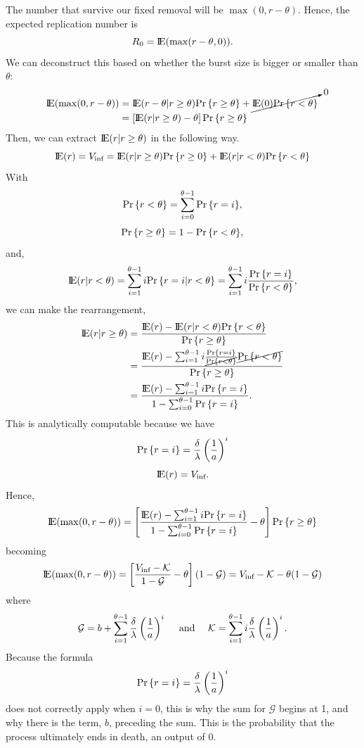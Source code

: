 The number that survive our fixed removal will be $\max({0, r-\theta})$. Hence, the expected replication number is
$$R_0 = {\rm I}\!{\rm E}(\max(r-\theta, 0)).$$
We can deconstruct this based on whether the burst size is bigger or smaller than $\theta$:
\begin{align*}
{\rm I}\!{\rm E}(\max(0, r-\theta))  &= {\rm I}\!{\rm E}(r-\theta | r \geq \theta) {\text{Pr}\left\{r\geq \theta\right\}} + \cancelto{0}{ {\rm I}\!{\rm E}(0){\text{Pr}\left\{r<\theta\right\}}}\\
& = \left[{\rm I}\!{\rm E}(r| r\geq \theta) - \theta\right]{\text{Pr}\left\{r\geq\theta\right\}}
\end{align*}
Then, we can extract ${\rm I}\!{\rm E}(r|r\geq\theta)$ in the following way. 
$${\rm I}\!{\rm E}(r) = V_{\text{inf}}= {\rm I}\!{\rm E}(r|r\geq\theta){\text{Pr}\left\{r\geq 0 \right\}}  + {\rm I}\!{\rm E}(r | r < \theta ){\text{Pr}\left\{r < \theta\right\}}$$
With 
$${\text{Pr}\left\{r<\theta\right\}} = \sum^{\theta - 1}_{i=0} {\text{Pr}\left\{r = i\right\}},$$
$${\text{Pr}\left\{r\geq \theta\right\}} = 1- {\text{Pr}\left\{r<\theta\right\}} ,$$
and,
$${\rm I}\!{\rm E}(r|r<\theta) = \sum^{\theta - 1}_{i=1} i {\text{Pr}\left\{r = i| r < \theta\right\}} =  \sum^{\theta - 1}_{i=1} i \frac{{\text{Pr}\left\{r = i\right\}}}{{\text{Pr}\left\{r < \theta\right\}}},$$
we can make the rearrangement,
\begin{align*}
{\rm I}\!{\rm E}(r|r\geq\theta) &= \frac{{\rm I}\!{\rm E}(r) - {\rm I}\!{\rm E}(r|r<\theta) {\text{Pr}\left\{r<\theta\right\}} }{{\text{Pr}\left\{r\geq \theta\right\}} }\\
&= \frac{{\rm I}\!{\rm E}(r) -       \sum^{\theta - 1}_{i=1} i \frac{{\text{Pr}\left\{r = i\right\}}}{\cancel{{\text{Pr}\left\{r < \theta\right\}}}}  \cancel{{\text{Pr}\left\{r<\theta\right\}}} }{{\text{Pr}\left\{r\geq \theta\right\}} }\\
&= \frac{{\rm I}\!{\rm E}(r)  -   \sum^{\theta - 1}_{i=1} i {\text{Pr}\left\{r = i\right\}} }{1 -  \sum^{\theta - 1}_{i=0} {\text{Pr}\left\{r = i\right\}}}.
\end{align*}
This is analytically computable because we have 
$${\text{Pr}\left\{r=i\right\}} = \frac{\delta}{\lambda}\left(\frac{1}{a}\right)^i$$
$${\rm I}\!{\rm E}(r) = V_{\text{inf}}. $$
Hence,
$${\rm I}\!{\rm E}(\max(0,r-\theta))  =  \left[  \frac{{\rm I}\!{\rm E}(r)  -   \sum^{\theta - 1}_{i=1} i {\text{Pr}\left\{r = i\right\}}}{1 -  \sum^{\theta - 1}_{i=0} {\text{Pr}\left\{r = i\right\}}}   - \theta\right] {\text{Pr}\left\{r\geq \theta\right\}}  $$
becoming 
$${\rm I}\!{\rm E}(\max(0,r-\theta))  =  \left[ \frac{V_{\text{inf}} -  \mathcal{K} }{1 -  \mathcal{G}} - \theta\right] \left(1 - \mathcal{G}\right)  = V_{\text{inf} }-  \mathcal{K} - \theta ( 1 -  \mathcal{G})$$
where 
$$\mathcal{G} = b+ \sum^{\theta - 1}_{i=1} \frac{\delta}{\lambda}\left(\frac{1}{a}\right)^i   \quad\text{ and } \quad \mathcal{K} =  \sum^{\theta - 1}_{i=1} i  \frac{\delta}{\lambda}\left(\frac{1}{a}\right)^i . $$
Because the formula 
$${\text{Pr}\left\{r=i\right\}} =  \frac{\delta}{\lambda}\left(\frac{1}{a}\right)^i$$ does not correctly apply when $i = 0$, this is why the sum for $\mathcal{G}$ begins at 1, and why there is the term, $b$, preceding the sum. This is the probability that the process ultimately ends in death, an output of 0. 



